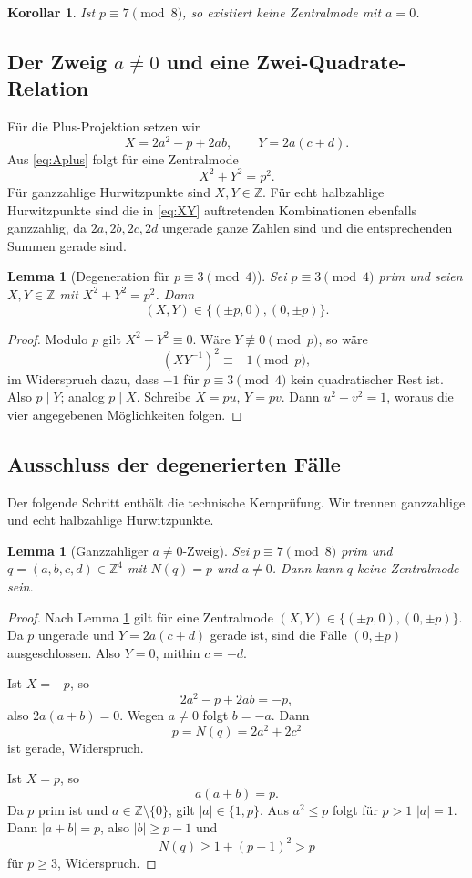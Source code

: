 \documentclass[11pt,a4paper]{article}
\newtheorem{lemma}[satz]{Lemma}
\newtheorem{korollar}[satz]{Korollar}
\theoremstyle{definition}
\newcommand{\ZZ}{\mathbb Z}
\begin{document}
\begin{korollar}\label{cor:a0}
Ist $p\equiv7\pmod8$, so existiert keine Zentralmode mit $a=0$.
\end{korollar}

\subsection{Der Zweig $a\neq0$ und eine Zwei-Quadrate-Relation}
Für die Plus-Projektion setzen wir
\begin{equation}\label{eq:XY}
X=2a^2-p+2ab,
\qquad
Y=2a(c+d).
\end{equation}
Aus \eqref{eq:Aplus} folgt für eine Zentralmode
\begin{equation}\label{eq:XYcircle}
X^2+Y^2=p^2.
\end{equation}
Für ganzzahlige Hurwitzpunkte sind $X,Y\in\ZZ$. Für echt halbzahlige Hurwitzpunkte sind die in \eqref{eq:XY} auftretenden Kombinationen ebenfalls ganzzahlig, da $2a,2b,2c,2d$ ungerade ganze Zahlen sind und die entsprechenden Summen gerade sind.

\begin{lemma}[Degeneration für $p\equiv3\pmod4$]\label{lem:degenerate}
Sei $p\equiv3\pmod4$ prim und seien $X,Y\in\ZZ$ mit $X^2+Y^2=p^2$. Dann
\[
(X,Y)\in\{(\pm p,0),(0,\pm p)\}.
\]
\end{lemma}
\begin{proof}
Modulo $p$ gilt $X^2+Y^2\equiv0$. Wäre $Y\not\equiv0\pmod p$, so wäre
\[
(XY^{-1})^2\equiv-1\pmod p,
\]
im Widerspruch dazu, dass $-1$ für $p\equiv3\pmod4$ kein quadratischer Rest ist. Also $p\mid Y$; analog $p\mid X$. Schreibe $X=pu$, $Y=pv$. Dann $u^2+v^2=1$, woraus die vier angegebenen Möglichkeiten folgen.
\end{proof}

\subsection{Ausschluss der degenerierten Fälle}
Der folgende Schritt enthält die technische Kernprüfung. Wir trennen ganzzahlige und echt halbzahlige Hurwitzpunkte.

\begin{lemma}[Ganzzahliger $a\neq0$-Zweig]\label{lem:intcase}
Sei $p\equiv7\pmod8$ prim und $q=(a,b,c,d)\in\ZZ^4$ mit $N(q)=p$ und $a\neq0$. Dann kann $q$ keine Zentralmode sein.
\end{lemma}
\begin{proof}
Nach Lemma \ref{lem:degenerate} gilt für eine Zentralmode $(X,Y)\in\{(\pm p,0),(0,\pm p)\}$. Da $p$ ungerade und $Y=2a(c+d)$ gerade ist, sind die Fälle $(0,\pm p)$ ausgeschlossen. Also $Y=0$, mithin $c=-d$.

Ist $X=-p$, so
\[
2a^2-p+2ab=-p,
\]
also $2a(a+b)=0$. Wegen $a\neq0$ folgt $b=-a$. Dann
\[
p=N(q)=2a^2+2c^2
\]
ist gerade, Widerspruch.

Ist $X=p$, so
\[
a(a+b)=p.
\]
Da $p$ prim ist und $a\in\ZZ\setminus\{0\}$, gilt $|a|\in\{1,p\}$. Aus $a^2\le p$ folgt für $p>1$ $|a|=1$. Dann $|a+b|=p$, also $|b|\ge p-1$ und
\[
N(q)\ge1+(p-1)^2>p
\]
für $p\ge3$, Widerspruch.
\end{proof}
\end{document}
